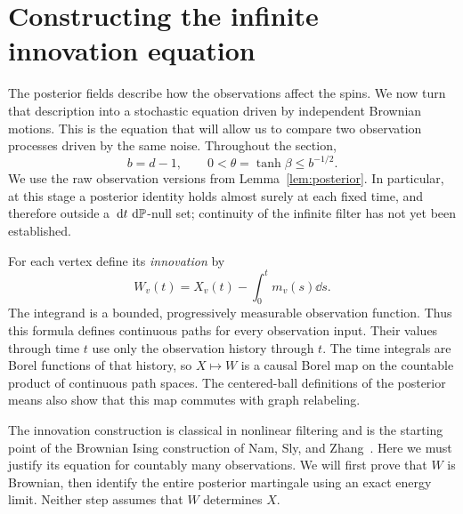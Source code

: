\section{Constructing the infinite innovation equation}
\label{sec:innovations}

The posterior fields describe how the observations affect the spins.
We now turn that description into a stochastic equation driven by
independent Brownian motions.  This is the equation that will allow us
to compare two observation processes driven by the same noise.
Throughout the section,
\[
 b=d-1,\qquad 0<\theta=\tanh\beta\le b^{-1/2}.
\]
We use the raw observation versions from Lemma~\ref{lem:posterior}.
In particular, at this stage a posterior identity holds almost surely
at each fixed time, and therefore outside a
$\,\mathrm d t\,\,\mathrm d\mathbb P$-null set; continuity of the infinite filter has not yet
been established.

For each vertex define its \emph{innovation} by
\begin{equation}
 \label{eq:innovations-definition}
 W_v(t)=X_v(t)-\int_0^t m_v(s)\dd s.
\end{equation}
The integrand is a bounded, progressively measurable observation
function.  Thus this formula defines continuous paths for every
observation input.  Their values through time $t$ use only the
observation history through $t$.  The time integrals are Borel
functions of that history, so $X\mapsto W$ is a causal Borel map on
the countable product of continuous path spaces.  The centered-ball
definitions of the posterior means also show that this map commutes
with graph relabeling.

The innovation construction is classical in nonlinear filtering
\cite{FujisakiKallianpurKunita1972} and is the starting point of the
Brownian Ising construction of Nam, Sly, and Zhang~\cite{NSZ}.  Here
we must justify its equation for countably many observations.  We will
first prove that $W$ is Brownian, then identify the entire posterior
martingale using an exact energy limit.  Neither step assumes that
$W$ determines $X$.


